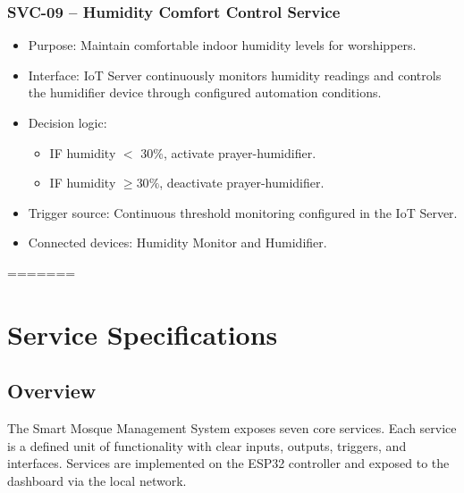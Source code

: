 \subsubsection*{SVC-09 -- Humidity Comfort Control Service}
\begin{itemize}
  \item Purpose: Maintain comfortable indoor humidity levels for worshippers.
  \item Interface: IoT Server continuously monitors humidity readings and controls the humidifier device through configured automation conditions.
  \item Decision logic:
  \begin{itemize}
    \item IF humidity $<$ 30\%, activate prayer-humidifier.
    \item IF humidity $\geq 30\%$, deactivate prayer-humidifier.
  \end{itemize}
  \item Trigger source: Continuous threshold monitoring configured in the IoT Server.
  \item Connected devices: Humidity Monitor and Humidifier.
\end{itemize}
=======
\newpage
\section{Service Specifications}

\subsection{Overview}
The Smart Mosque Management System exposes seven core services. Each service is a defined unit of functionality with clear inputs, outputs, triggers, and interfaces. Services are implemented on the ESP32 controller and exposed to the dashboard via the local network.

